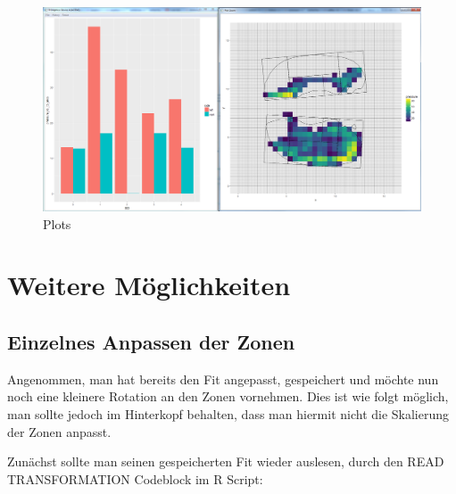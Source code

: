 \documentclass[a4paper, openany, oneside]{memoir}
\begin{document}
\begin{figure}
\begin{center}
\includegraphics[height = 0.7\textheight, width=1\textwidth,keepaspectratio]{plots.png}
\end{center}
\caption{Plots}
\label{img_plots}
\end{figure}


\chapter{Weitere Möglichkeiten}
\section{Einzelnes Anpassen der Zonen}
Angenommen, man hat bereits den Fit angepasst, gespeichert und möchte nun noch eine kleinere Rotation an den Zonen vornehmen. Dies ist wie folgt möglich, man sollte jedoch im Hinterkopf behalten, dass man hiermit nicht die Skalierung der Zonen anpasst.

Zunächst sollte man seinen gespeicherten Fit wieder auslesen, durch den READ TRANSFORMATION Codeblock im R Script:
\end{document}
